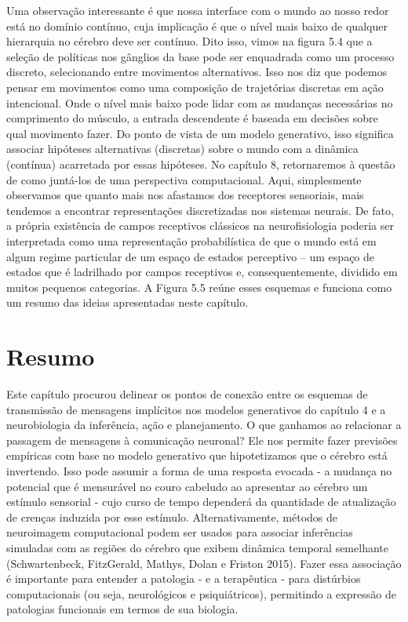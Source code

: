 \documentclass[
  12pt,
]{book}
\begin{document}
Uma observação interessante é que nossa interface com o mundo ao nosso redor está no domínio contínuo, cuja implicação é que o nível mais baixo de qualquer hierarquia no cérebro deve ser contínuo. Dito isso, vimos na figura 5.4 que a seleção de políticas nos gânglios da base pode ser enquadrada como um processo discreto, selecionando entre movimentos alternativos. Isso nos diz que podemos pensar em movimentos como uma composição de trajetórias discretas em ação intencional. Onde o nível mais baixo pode lidar com as mudanças necessárias no comprimento do músculo, a entrada descendente é baseada em decisões sobre qual movimento fazer. Do ponto de vista de um modelo generativo, isso significa associar hipóteses alternativas (discretas) sobre o mundo com a dinâmica (contínua) acarretada por essas hipóteses. No capítulo 8, retornaremos à questão de como juntá-los de uma perspectiva computacional. Aqui, simplesmente observamos que quanto mais nos afastamos dos receptores sensoriais, mais tendemos a encontrar representações discretizadas nos sistemas neurais. De fato, a própria existência de campos receptivos clássicos na neurofisiologia poderia ser interpretada como uma representação probabilística de que o mundo está em algum regime particular de um espaço de estados perceptivo -- um espaço de estados que é ladrilhado por campos receptivos e, consequentemente, dividido em muitos pequenos categorias. A Figura 5.5 reúne esses esquemas e funciona como um resumo das ideias apresentadas neste capítulo.

\hypertarget{resumo-4}{%
\section{Resumo}\label{resumo-4}}

Este capítulo procurou delinear os pontos de conexão entre os esquemas de transmissão de mensagens implícitos nos modelos generativos do capítulo 4 e a neurobiologia da inferência, ação e planejamento. O que ganhamos ao relacionar a passagem de mensagens à comunicação neuronal? Ele nos permite fazer previsões empíricas com base no modelo generativo que hipotetizamos que o cérebro está invertendo. Isso pode assumir a forma de uma resposta evocada - a mudança no potencial que é mensurável no couro cabeludo ao apresentar ao cérebro um estímulo sensorial - cujo curso de tempo dependerá da quantidade de atualização de crenças induzida por esse estímulo. Alternativamente, métodos de neuroimagem computacional podem ser usados \hspace{0pt}\hspace{0pt}para associar inferências simuladas com as regiões do cérebro que exibem dinâmica temporal semelhante (Schwartenbeck, FitzGerald, Mathys, Dolan e Friston 2015). Fazer essa associação é importante para entender a patologia - e a terapêutica - para distúrbios computacionais (ou seja, neurológicos e psiquiátricos), permitindo a expressão de patologias funcionais em termos de sua biologia.
\end{document}
